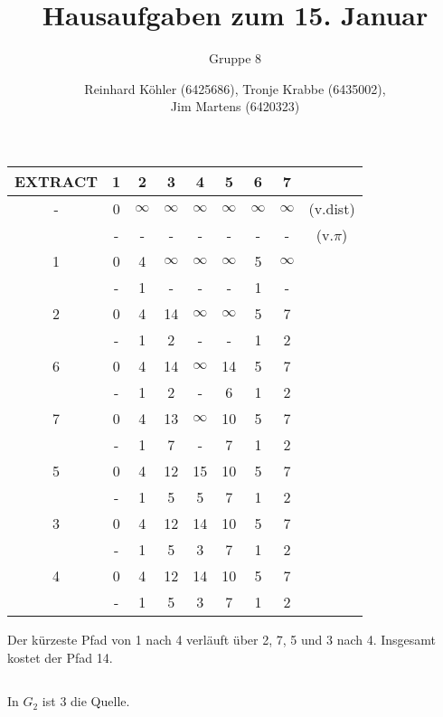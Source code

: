 \documentclass[10pt,a4paper,oneside,ngerman,numbers=noenddot]{scrartcl}
\begin{document}
\author{Reinhard Köhler (6425686), Tronje Krabbe (6435002), \\
Jim Martens (6420323)}
\title{Hausaufgaben zum 15. Januar}
\subtitle{Gruppe 8}
\maketitle

\section{} %
	\subsection{} %
		\begin{tabular}{c|c|c|c|c|c|c|c|c}
			EXTRACT & 1 & 2 & 3 & 4 & 5 & 6 & 7 &\\
			\hline
			- & 0 & $\infty$ & $\infty$ & $\infty$ & $\infty$ & $\infty$ & $\infty$ & (v.dist) \\
			& - & - & - & - & - & - & - & (v.$\pi$) \\
			\hline
			1 & 0 & 4 & $\infty$ & $\infty$ & $\infty$ & 5 & $\infty$ & \\
			& - & 1 & - & - & - & 1 & - & \\
			\hline
			2 & 0 & 4 & 14 & $\infty$ & $\infty$ & 5 & 7 & \\
			& - & 1 & 2 & - & - & 1 & 2 & \\
			\hline
			6 & 0 & 4 & 14 & $\infty$ & 14 & 5 & 7 & \\
			& - & 1 & 2 & - & 6 & 1 & 2 & \\
			\hline
			7 & 0 & 4 & 13 & $\infty$ & 10 & 5 & 7 & \\
			& - & 1 & 7 & - & 7 & 1 & 2 & \\
			\hline
			5 & 0 & 4 & 12 & 15 & 10 & 5 & 7 & \\
			& - & 1 & 5 & 5 & 7 & 1 & 2 & \\
			\hline
			3 & 0 & 4 & 12 & 14 & 10 & 5 & 7 & \\
			& - & 1 & 5 & 3 & 7 & 1 & 2 & \\
			\hline
			4 & 0 & 4 & 12 & 14 & 10 & 5 & 7 & \\
			& - & 1 & 5 & 3 & 7 & 1 & 2 & 
		\end{tabular}
		
		Der kürzeste Pfad von 1 nach 4 verläuft über 2, 7, 5 und 3 nach 4. Insgesamt kostet der Pfad 14.
	\subsection{} %
		In $G_{2}$ ist 3 die Quelle. 
		
\end{document}
